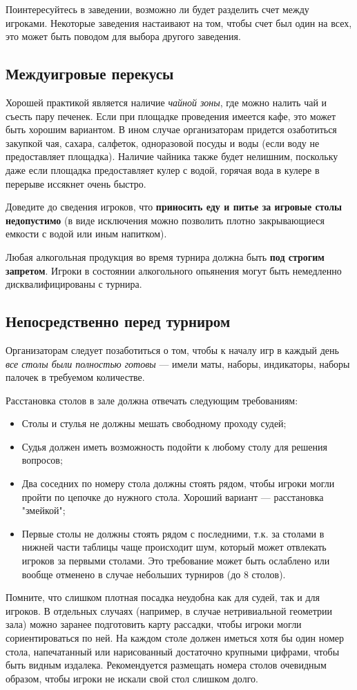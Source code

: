 Поинтересуйтесь в заведении, возможно ли будет разделить счет между игроками. Некоторые заведения настаивают на том, чтобы счет был один на всех, это может быть поводом для выбора другого заведения.

\subsection{Междуигровые перекусы}

Хорошей практикой является наличие \textit{чайной зоны}, где можно налить чай и съесть пару печенек. Если при площадке проведения имеется кафе, это может быть хорошим вариантом. В ином случае организаторам придется озаботиться закупкой чая, сахара, салфеток, одноразовой посуды и воды (если воду не предоставляет площадка). Наличие чайника также будет нелишним, поскольку даже если площадка предоставляет кулер с водой, горячая вода в кулере в перерыве иссякнет очень быстро.

Доведите до сведения игроков, что \textbf{приносить еду и питье за игровые столы недопустимо} (в виде исключения можно позволить плотно закрывающиеся емкости с водой или иным напитком).

Любая алкогольная продукция во время турнира должна быть \textbf{под строгим запретом}. Игроки в состоянии алкогольного опьянения могут быть немедленно дисквалифицированы с турнира.

\subsection{Непосредственно перед турниром}

Организаторам следует позаботиться о том, чтобы к началу игр в каждый день \textit{все столы были полностью готовы} --- имели маты, наборы, индикаторы, наборы палочек в требуемом количестве. 

Расстановка столов в зале должна отвечать следующим требованиям:
\begin{itemize}
	\item Столы и стулья не должны мешать свободному проходу судей;
	\item Судья должен иметь возможность подойти к любому столу для решения вопросов;
	\item Два соседних по номеру стола должны стоять рядом, чтобы игроки могли пройти по цепочке до нужного стола. Хороший вариант --- расстановка "змейкой";
	\item Первые столы не должны стоять рядом с последними, т.к. за столами в нижней части таблицы чаще происходит шум, который может отвлекать игроков за первыми столами. Это требование может быть ослаблено или вообще отменено в случае небольших турниров (до 8 столов).
\end{itemize}
Помните, что слишком плотная посадка неудобна как для судей, так и для игроков. В отдельных случаях (например, в случае нетривиальной геометрии зала) можно заранее подготовить карту рассадки, чтобы игроки могли сориентироваться по ней. На каждом столе должен иметься хотя бы один номер стола, напечатанный или нарисованный достаточно крупными цифрами, чтобы быть видным издалека. Рекомендуется размещать номера столов очевидным образом, чтобы игроки не искали свой стол слишком долго.

